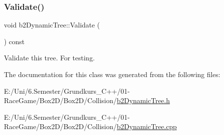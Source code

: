\subsubsection{\texorpdfstring{Validate()}{Validate()}}
{\footnotesize\ttfamily void b2\+Dynamic\+Tree\+::\+Validate (\begin{DoxyParamCaption}{ }\end{DoxyParamCaption}) const}



Validate this tree. For testing. 



The documentation for this class was generated from the following files\+:\begin{DoxyCompactItemize}
\item 
E\+:/\+Uni/6.\+Semester/\+Grundkurs\+\_\+\+C++/01-\/\+Race\+Game/\+Box2\+D/\+Box2\+D/\+Collision/\mbox{\hyperlink{b2_dynamic_tree_8h}{b2\+Dynamic\+Tree.\+h}}\item 
E\+:/\+Uni/6.\+Semester/\+Grundkurs\+\_\+\+C++/01-\/\+Race\+Game/\+Box2\+D/\+Box2\+D/\+Collision/\mbox{\hyperlink{b2_dynamic_tree_8cpp}{b2\+Dynamic\+Tree.\+cpp}}\end{DoxyCompactItemize}
